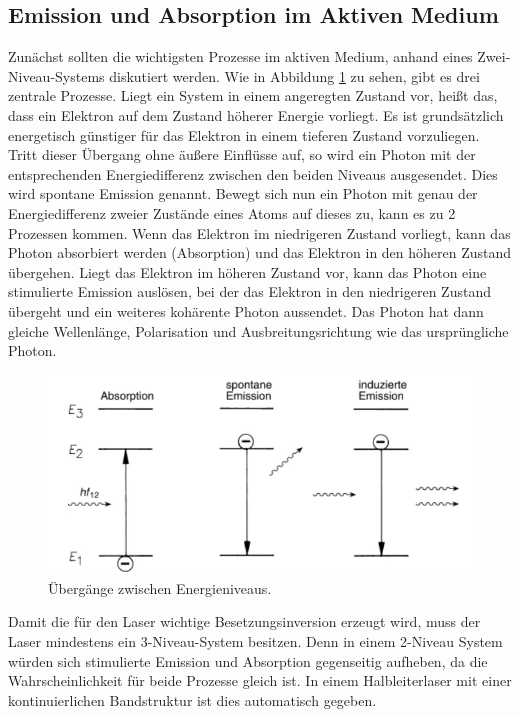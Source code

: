 \subsection{Emission und Absorption im Aktiven Medium}
Zunächst sollten die wichtigsten Prozesse im aktiven Medium, anhand eines Zwei-Niveau-Systems diskutiert werden. 
Wie in Abbildung \ref{fig:Prozesse} zu sehen, gibt es drei zentrale Prozesse. Liegt ein System in einem angeregten Zustand vor, heißt das, dass ein Elektron auf dem Zustand höherer Energie vorliegt.
Es ist grundsätzlich energetisch günstiger für das Elektron in einem tieferen Zustand vorzuliegen. Tritt dieser Übergang ohne äußere Einflüsse auf, so wird ein Photon mit der entsprechenden Energiedifferenz zwischen den beiden Niveaus ausgesendet. Dies wird spontane Emission genannt.
Bewegt sich nun ein Photon mit genau der Energiedifferenz zweier Zustände eines Atoms auf dieses zu, kann es zu 2 Prozessen kommen.
Wenn das Elektron im niedrigeren Zustand vorliegt, kann das Photon absorbiert werden (Absorption) und 
das Elektron in den höheren Zustand übergehen. Liegt das Elektron im höheren Zustand vor, kann das Photon eine stimulierte Emission auslösen, bei der 
das Elektron in den niedrigeren Zustand übergeht und ein weiteres kohärente Photon aussendet. Das Photon hat dann gleiche Wellenlänge, Polarisation und Ausbreitungsrichtung wie das ursprüngliche Photon.
\begin{figure}[H]
    \centering
    \includegraphics[scale=0.9]{pictures/Prozesse.png}
    \caption{Übergänge zwischen Energieniveaus\cite{Eichler20152}.}
    \label{fig:Prozesse}
\end{figure}
\noindent Damit die für den Laser wichtige Besetzungsinversion erzeugt wird, muss der Laser mindestens ein 3-Niveau-System besitzen.
Denn in einem 2-Niveau System würden sich stimulierte Emission und Absorption gegenseitig aufheben, da die Wahrscheinlichkeit für beide Prozesse gleich ist.
In einem Halbleiterlaser mit einer kontinuierlichen Bandstruktur ist dies automatisch gegeben.
